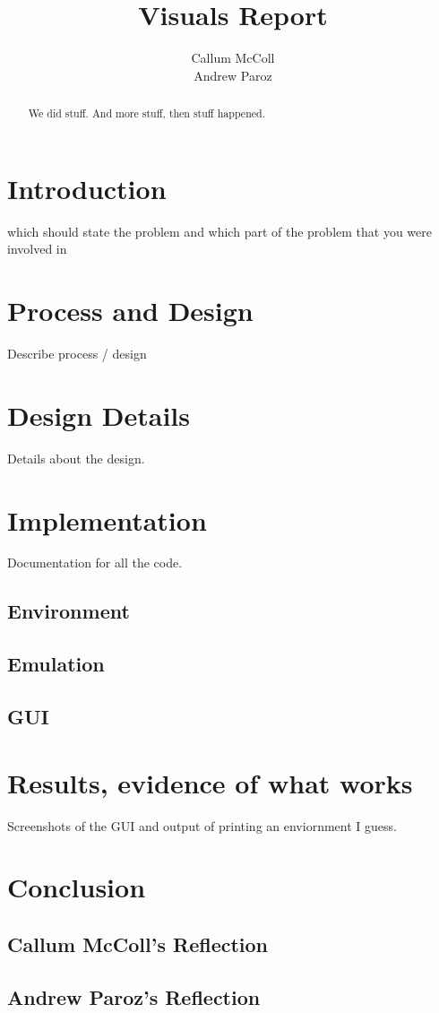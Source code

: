 \documentclass{article}
\begin{document}
\title{Visuals Report}
\author{Callum McColl\\
	    Andrew Paroz}
		
\maketitle

\begin{abstract}
We did stuff. And more stuff, then stuff happened.
\end{abstract}

\tableofcontents

\listoffigures

\section{Introduction}

which should state the problem and which part of the problem that you were involved in

\section{Process and Design}
Describe process / design

\section{Design Details}
Details about the design.

\section{Implementation}
Documentation for all the code.

\subsection{Environment}


\subsection{Emulation}


\subsection{GUI}

\section{Results, evidence of what works}
Screenshots of the GUI and output of printing an enviornment I guess.

\section{Conclusion}

\subsection{Callum McColl's Reflection}

\subsection{Andrew Paroz's Reflection}
\end{document}
